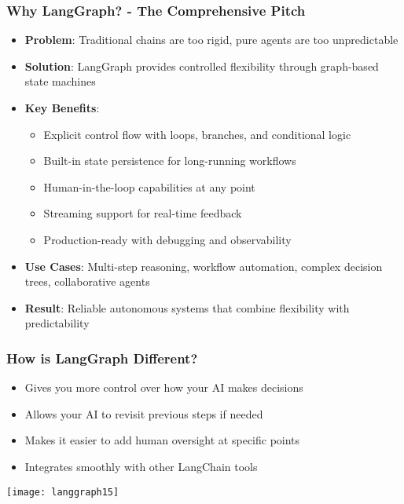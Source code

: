 \begin{frame}[fragile]\frametitle{Why LangGraph? - The Comprehensive Pitch}
      \begin{itemize}
        \item \textbf{Problem}: Traditional chains are too rigid, pure agents are too unpredictable
        \item \textbf{Solution}: LangGraph provides controlled flexibility through graph-based state machines
        \item \textbf{Key Benefits}:
        \begin{itemize}
            \item Explicit control flow with loops, branches, and conditional logic
            \item Built-in state persistence for long-running workflows
            \item Human-in-the-loop capabilities at any point
            \item Streaming support for real-time feedback
            \item Production-ready with debugging and observability
        \end{itemize}
        \item \textbf{Use Cases}: Multi-step reasoning, workflow automation, complex decision trees, collaborative agents
        \item \textbf{Result}: Reliable autonomous systems that combine flexibility with predictability
      \end{itemize}
\end{frame}

\begin{frame}[fragile]\frametitle{How is LangGraph Different?}


      \begin{itemize}
        \item Gives you more control over how your AI makes decisions
        \item Allows your AI to revisit previous steps if needed
        \item Makes it easier to add human oversight at specific points
        \item Integrates smoothly with other LangChain tools
      \end{itemize}


\begin{center}
\texttt{[image: langgraph15]}
\end{center}

\end{frame}

